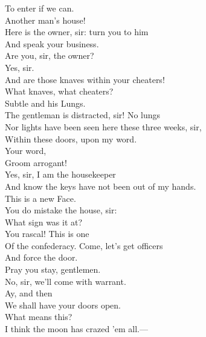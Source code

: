 \documentclass[a4paper,oneside,12pt]{memoir}
\begin{document}
\begin{drama*}
\mammonspeaks To enter if we can.\\
\facespeaks {} Another man's house!\\
Here is the owner, sir: turn you to him\\
And speak your business.\\
\mammonspeaks {} Are you, sir, the owner?\\
\lovewitspeaks Yes, sir.\\
\mammonspeaks {} And are those knaves within your cheaters!\\
\lovewitspeaks What knaves, what cheaters?\\
\mammonspeaks {} Subtle and his Lungs.\\
\facespeaks The gentleman is distracted, sir! No lungs\\
Nor lights have been seen here these three weeks, sir,\\
Within these doors, upon my word.\\
\surlyspeaks {} Your word,\\
Groom arrogant!\\
\facespeaks {} Yes, sir, I am the housekeeper\\
And know the keys have not been out of my hands.\\
\surlyspeaks This is a new Face.\\
\facespeaks {} You do mistake the house, sir:\\
What sign was it at?\\
\surlyspeaks {} You rascal! This is one\\
Of the confederacy. Come, let's get officers\\
And force the door.\\
\lovewitspeaks {} Pray you stay, gentlemen.\\
\surlyspeaks No, sir, we'll come with warrant.\\
\mammonspeaks {} Ay, and then\\
We shall have your doors open.\\
\lovewitspeaks {} What means this?\\
\facespeaks I think the moon has crazed 'em all.---\\

\end{drama*}
\end{document}
